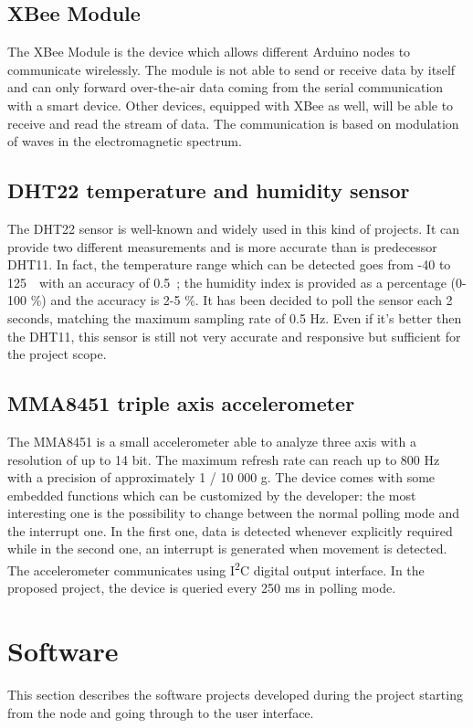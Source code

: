 \documentclass[a4paper,11pt]{scrartcl}
\begin{document}
\subsection{XBee Module}
The XBee Module is the device which allows different Arduino nodes to communicate wirelessly. The module is not able to send or receive data by itself and can only forward over-the-air data coming from the serial communication with a smart device. Other devices, equipped with XBee as well, will be able to receive and read the stream of data. The communication is based on modulation of waves in the electromagnetic spectrum.

\subsection{DHT22 temperature and humidity sensor}
The DHT22 sensor is well-known and widely used in this kind of projects. It can provide two different measurements and is more accurate than is predecessor DHT11. In fact, the temperature range which can be detected goes from -40 to 125\, \celsius\ with an accuracy of 0.5\, \celsius; the humidity index is provided as a percentage (0-100 \%) and the accuracy is 2-5 \%. It has been decided to poll the sensor each 2 seconds, matching the maximum sampling rate of 0.5 Hz. Even if it's better then the DHT11, this sensor is still not very accurate and responsive but sufficient for the project scope. 

\subsection{MMA8451 triple axis accelerometer}
The MMA8451 is a small accelerometer able to analyze three axis with a resolution of up to 14 bit. The maximum refresh rate can reach up to 800 Hz with a precision of approximately 1 / 10 000 g. The device comes with some embedded functions which can be customized by the developer: the most interesting one is the possibility to change between the normal polling mode and the interrupt one. In the first one, data is detected whenever explicitly required while in the second one, an interrupt is generated when movement is detected. The accelerometer communicates using I\textsuperscript{2}C digital output interface. In the proposed project, the device is queried every 250 ms in polling mode.

\section{Software}
This section describes the software projects developed during the project starting from the node and going through to the user interface.
\end{document}

